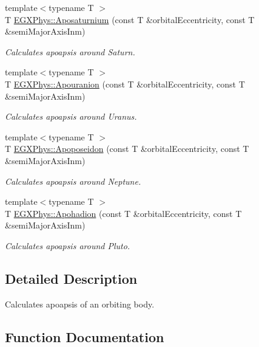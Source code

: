 \begin{DoxyCompactItemize}
{\footnotesize template$<$typename T $>$ }\\T \mbox{\hyperlink{group___e_g_x_phys-_apoapsis_gabb69067baa611c8bda701d7040cc47b6}{E\+G\+X\+Phys\+::\+Aposaturnium}} (const T \&orbital\+Eccentricity, const T \&semi\+Major\+Axis\+Inm)
\begin{DoxyCompactList}\small\item\em Calculates apoapsis around Saturn. \end{DoxyCompactList}\item 
{\footnotesize template$<$typename T $>$ }\\T \mbox{\hyperlink{group___e_g_x_phys-_apoapsis_gae6f96c6d840188839132e0ef94ce0711}{E\+G\+X\+Phys\+::\+Apouranion}} (const T \&orbital\+Eccentricity, const T \&semi\+Major\+Axis\+Inm)
\begin{DoxyCompactList}\small\item\em Calculates apoapsis around Uranus. \end{DoxyCompactList}\item 
{\footnotesize template$<$typename T $>$ }\\T \mbox{\hyperlink{group___e_g_x_phys-_apoapsis_ga985afde0717360cffc6b5c17c9a42ac8}{E\+G\+X\+Phys\+::\+Apoposeidon}} (const T \&orbital\+Eccentricity, const T \&semi\+Major\+Axis\+Inm)
\begin{DoxyCompactList}\small\item\em Calculates apoapsis around Neptune. \end{DoxyCompactList}\item 
{\footnotesize template$<$typename T $>$ }\\T \mbox{\hyperlink{group___e_g_x_phys-_apoapsis_ga9e2578ab880b46f0736936608710f4ad}{E\+G\+X\+Phys\+::\+Apohadion}} (const T \&orbital\+Eccentricity, const T \&semi\+Major\+Axis\+Inm)
\begin{DoxyCompactList}\small\item\em Calculates apoapsis around Pluto. \end{DoxyCompactList}\end{DoxyCompactItemize}


\subsection{Detailed Description}
Calculates apoapsis of an orbiting body. 

\subsection{Function Documentation}
\mbox{\label{group___e_g_x_phys-_apoapsis_ga809627c2522d7b4db0f27d6ea89e4f89}} 
